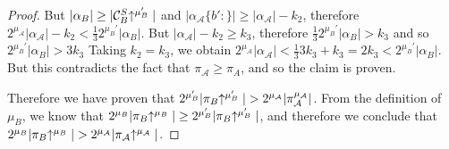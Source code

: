 \begin{proof}
    But $|\alpha_B| \geq |\mathcal{C}_B^S\negthickspace\uparrow^{\mu_B'}|$ and
    $|\alpha_\mathcal{A}\{b':\}| \geq |\alpha_\mathcal{A}| - k_2$, therefore
    $2^{\mu_\mathcal{A}}|\alpha_\mathcal{A}| - k_2 <
    \frac{1}{3}2^{\mu_B'}|\alpha_B|$.
    But $|\alpha_\mathcal{A}| - k_2 \geq k_3$, therefore
    $\frac{1}{3}2^{\mu_B'}|\alpha_B| > k_3$ and so $2^{\mu_B'}|\alpha_B| > 3k_3$
    Taking $k_2 = k_3$, we obtain
    $2^{\mu_\mathcal{A}}|\alpha_\mathcal{A}| <
    \frac{1}{3}3k_3 + k_3 = 2k_3 < 2^{\mu_B'}|\alpha_B|$.
    But this contradicts the fact that
    $\pi_\mathcal{A} \geq \pi_A$, and so the claim is proven.

    Therefore we have proven that $2^{\mu_B'}|\pi_B\negthickspace\uparrow^{\mu_B'}| >
    2^{\mu_\mathcal{A}}|\pi_\mathcal{A}^{\mu_\mathcal{A}}|$.
    From the definition of $\mu_B$, we know that
    $2^{\mu_B}|\pi_B\negthickspace\uparrow^{\mu_B}| \geq 2^{\mu_B'}|\pi_B\negthickspace\uparrow^{\mu_B'}|$,
    and therefore we conclude that $2^{\mu_B}|\pi_B\negthickspace\uparrow^{\mu_B}| >
    2^{\mu_\mathcal{A}}|\pi_\mathcal{A}\negthickspace\uparrow^{\mu_\mathcal{A}}|$.
    \Qed
%
\end{proof}
